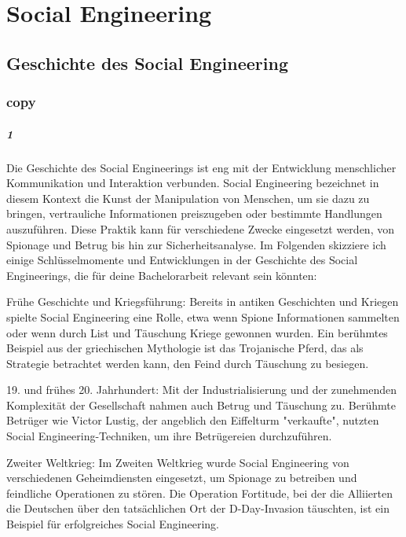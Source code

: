 \chapter{Social Engineering}\label{ch:SocialEngineering}

\section{Geschichte des Social Engineering}

\subsection*{copy}

\paragraph*{1}
Die Geschichte des Social Engineerings ist eng mit der Entwicklung menschlicher Kommunikation und Interaktion verbunden. Social Engineering bezeichnet in diesem Kontext die Kunst der Manipulation von Menschen, um sie dazu zu bringen, vertrauliche Informationen preiszugeben oder bestimmte Handlungen auszuführen. Diese Praktik kann für verschiedene Zwecke eingesetzt werden, von Spionage und Betrug bis hin zur Sicherheitsanalyse. Im Folgenden skizziere ich einige Schlüsselmomente und Entwicklungen in der Geschichte des Social Engineerings, die für deine Bachelorarbeit relevant sein könnten:

Frühe Geschichte und Kriegsführung: Bereits in antiken Geschichten und Kriegen spielte Social Engineering eine Rolle, etwa wenn Spione Informationen sammelten oder wenn durch List und Täuschung Kriege gewonnen wurden. Ein berühmtes Beispiel aus der griechischen Mythologie ist das Trojanische Pferd, das als Strategie betrachtet werden kann, den Feind durch Täuschung zu besiegen.

19. und frühes 20. Jahrhundert: Mit der Industrialisierung und der zunehmenden Komplexität der Gesellschaft nahmen auch Betrug und Täuschung zu. Berühmte Betrüger wie Victor Lustig, der angeblich den Eiffelturm "verkaufte", nutzten Social Engineering-Techniken, um ihre Betrügereien durchzuführen.

Zweiter Weltkrieg: Im Zweiten Weltkrieg wurde Social Engineering von verschiedenen Geheimdiensten eingesetzt, um Spionage zu betreiben und feindliche Operationen zu stören. Die Operation Fortitude, bei der die Alliierten die Deutschen über den tatsächlichen Ort der D-Day-Invasion täuschten, ist ein Beispiel für erfolgreiches Social Engineering.

